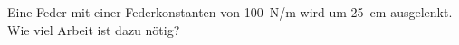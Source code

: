 
\begin{aufgabe}
	Eine Feder mit einer Federkonstanten von \SI{100}{N/m} wird um \SI{25}{cm} ausgelenkt.
	Wie viel Arbeit ist dazu nötig?
\end{aufgabe}
\begin{loesung}

\end{loesung}
